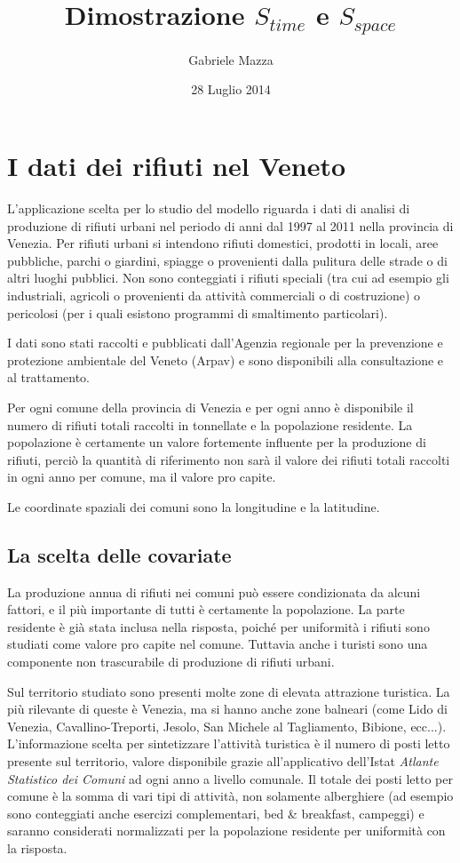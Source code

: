 \documentclass[a4paper,11pt,twoside,openright]{book}							%
\date{28 Luglio 2014}
\author{Gabriele Mazza}
\title{Dimostrazione $S_{time}$ e $S_{space}$}
\begin{document}

\chapter{I dati dei rifiuti nel Veneto}


L'applicazione scelta per lo studio del modello riguarda i dati di analisi di produzione di rifiuti urbani nel periodo di anni dal 1997 al 2011 nella provincia di Venezia. Per rifiuti urbani si intendono rifiuti domestici, prodotti in locali, aree pubbliche, parchi o giardini, spiagge o provenienti dalla pulitura delle strade o di altri luoghi pubblici. Non sono conteggiati i rifiuti speciali (tra cui ad esempio gli industriali, agricoli o provenienti da attività commerciali o di costruzione) o pericolosi (per i quali esistono programmi di smaltimento particolari).

I dati sono stati raccolti e pubblicati dall'Agenzia regionale per la prevenzione e protezione ambientale del Veneto (Arpav) e sono disponibili alla consultazione e al trattamento.

Per ogni comune della provincia di Venezia e per ogni anno è disponibile il numero di rifiuti totali raccolti in tonnellate e la popolazione residente. La popolazione è certamente un valore fortemente influente per la produzione di rifiuti, perciò la quantità di riferimento non sarà il valore dei rifiuti totali raccolti in ogni anno per comune, ma il valore pro capite.

Le coordinate spaziali dei comuni sono la longitudine e la latitudine.


\section{La scelta delle covariate}

La produzione annua di rifiuti nei comuni può essere condizionata da alcuni fattori, e il più importante di tutti è certamente la popolazione. La parte residente è già stata inclusa nella risposta, poiché per uniformità i rifiuti sono studiati come valore pro capite nel comune. Tuttavia anche i turisti sono una componente non trascurabile di produzione di rifiuti urbani.

Sul territorio studiato sono presenti molte zone di elevata attrazione turistica. La più rilevante di queste è Venezia, ma si hanno anche zone balneari (come Lido di Venezia, Cavallino-Treporti, Jesolo, San Michele al Tagliamento, Bibione, ecc...). L'informazione scelta per sintetizzare l'attività turistica è il numero di posti letto presente sul territorio, valore disponibile grazie all'applicativo dell'Istat \textit{Atlante Statistico dei Comuni} ad ogni anno a livello comunale. Il totale dei posti letto per comune è la somma di vari tipi di attività, non solamente alberghiere (ad esempio sono conteggiati anche esercizi complementari, bed \& breakfast, campeggi) e saranno considerati normalizzati per la popolazione residente per uniformità con la risposta.
\end{document}
